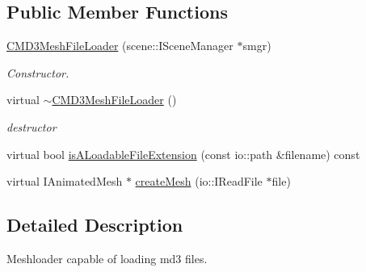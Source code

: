\subsection*{Public Member Functions}
\begin{DoxyCompactItemize}
\item 
\hypertarget{classirr_1_1scene_1_1_c_m_d3_mesh_file_loader_ab7419c520097258d6e4904e54199faeb}{\hyperlink{classirr_1_1scene_1_1_c_m_d3_mesh_file_loader_ab7419c520097258d6e4904e54199faeb}{C\-M\-D3\-Mesh\-File\-Loader} (scene\-::\-I\-Scene\-Manager $\ast$smgr)}\label{classirr_1_1scene_1_1_c_m_d3_mesh_file_loader_ab7419c520097258d6e4904e54199faeb}

\begin{DoxyCompactList}\small\item\em Constructor. \end{DoxyCompactList}\item 
\hypertarget{classirr_1_1scene_1_1_c_m_d3_mesh_file_loader_af874687f459119bb7f627c26f3139b5c}{virtual \hyperlink{classirr_1_1scene_1_1_c_m_d3_mesh_file_loader_af874687f459119bb7f627c26f3139b5c}{$\sim$\-C\-M\-D3\-Mesh\-File\-Loader} ()}\label{classirr_1_1scene_1_1_c_m_d3_mesh_file_loader_af874687f459119bb7f627c26f3139b5c}

\begin{DoxyCompactList}\small\item\em destructor \end{DoxyCompactList}\item 
virtual bool \hyperlink{classirr_1_1scene_1_1_c_m_d3_mesh_file_loader_adfc3c2449b417b8acc940615ee65859c}{is\-A\-Loadable\-File\-Extension} (const io\-::path \&filename) const 
\item 
virtual I\-Animated\-Mesh $\ast$ \hyperlink{classirr_1_1scene_1_1_c_m_d3_mesh_file_loader_a0e5439f0ff1c2fd8baedf35ddcf53bea}{create\-Mesh} (io\-::\-I\-Read\-File $\ast$file)
\end{DoxyCompactItemize}


\subsection{Detailed Description}
Meshloader capable of loading md3 files. 

